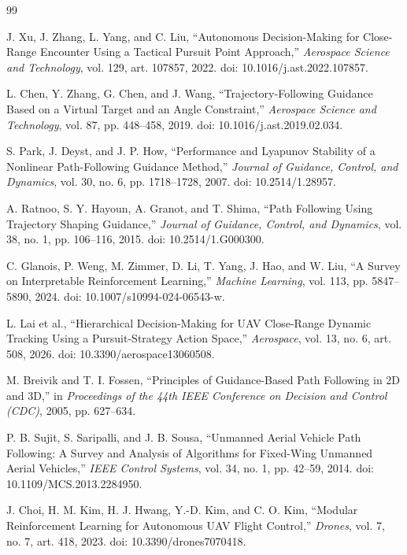 \documentclass[5p,times]{elsarticle} %
\begin{document}
\begin{thebibliography}{99}

J. Xu, J. Zhang, L. Yang, and C. Liu,
``Autonomous Decision-Making for Close-Range Encounter Using a Tactical Pursuit Point Approach,''
\emph{Aerospace Science and Technology}, vol. 129, art. 107857, 2022.
doi: 10.1016/j.ast.2022.107857.

L. Chen, Y. Zhang, G. Chen, and J. Wang,
``Trajectory-Following Guidance Based on a Virtual Target and an Angle Constraint,''
\emph{Aerospace Science and Technology}, vol. 87, pp. 448--458, 2019.
doi: 10.1016/j.ast.2019.02.034.

S. Park, J. Deyst, and J. P. How,
``Performance and Lyapunov Stability of a Nonlinear Path-Following Guidance Method,''
\emph{Journal of Guidance, Control, and Dynamics}, vol. 30, no. 6, pp. 1718--1728, 2007.
doi: 10.2514/1.28957.

A. Ratnoo, S. Y. Hayoun, A. Granot, and T. Shima,
``Path Following Using Trajectory Shaping Guidance,''
\emph{Journal of Guidance, Control, and Dynamics}, vol. 38, no. 1, pp. 106--116, 2015.
doi: 10.2514/1.G000300.

C. Glanois, P. Weng, M. Zimmer, D. Li, T. Yang, J. Hao, and W. Liu,
``A Survey on Interpretable Reinforcement Learning,''
\emph{Machine Learning}, vol. 113, pp. 5847--5890, 2024.
doi: 10.1007/s10994-024-06543-w.

L. Lai et al.,
``Hierarchical Decision-Making for UAV Close-Range Dynamic Tracking Using a Pursuit-Strategy Action Space,''
\emph{Aerospace}, vol. 13, no. 6, art. 508, 2026.
doi: 10.3390/aerospace13060508.

M. Breivik and T. I. Fossen,
``Principles of Guidance-Based Path Following in 2D and 3D,''
in \emph{Proceedings of the 44th IEEE Conference on Decision and Control (CDC)}, 2005, pp. 627--634.

P. B. Sujit, S. Saripalli, and J. B. Sousa,
``Unmanned Aerial Vehicle Path Following: A Survey and Analysis of Algorithms for Fixed-Wing Unmanned Aerial Vehicles,''
\emph{IEEE Control Systems}, vol. 34, no. 1, pp. 42--59, 2014.
doi: 10.1109/MCS.2013.2284950.

J. Choi, H. M. Kim, H. J. Hwang, Y.-D. Kim, and C. O. Kim,
``Modular Reinforcement Learning for Autonomous UAV Flight Control,''
\emph{Drones}, vol. 7, no. 7, art. 418, 2023.
doi: 10.3390/drones7070418.


\end{thebibliography}
\end{document}
